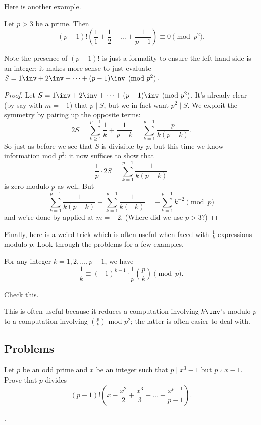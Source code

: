 \documentclass[11pt]{scrartcl}
\begin{document}
Here is another example.
\begin{example}
  Let $p > 3$ be a prime.
  Then
  \[ (p-1)!\left( \frac11 + \frac12 + \dots + \frac1{p-1} \right) \equiv 0 \pmod{p^2}. \]
\end{example}
Note the presence of $(p-1)!$ is just a formality to ensure
the left-hand side is an integer; it makes more sense
to just evaluate $S = 1\inv + 2\inv + \dots + (p-1)\inv \pmod{p^2}$.
\begin{proof}
  Let $S = 1\inv + 2\inv + \dots + (p-1)\inv \pmod{p^2}$.
  It's already clear (by say  with $m = -1$)
  that $p \mid S$, but we in fact want $p^2 \mid S$.
  We exploit the symmetry by pairing up the opposite terms:
  \[
    2S = \sum_{k \ge 1}^{p-1} \frac{1}{k} + \frac{1}{p-k}
    = \sum_{k=1}^{p-1} \frac{p}{k(p-k)}.
  \]
  So just as before we see that $S$ is divisible by $p$,
  but this time we know information mod $p^2$: it now suffices to show that
  \[ \frac{1}{p} \cdot 2S = \sum_{k=1}^{p-1} \frac{1}{k(p-k)} \]
  is zero modulo $p$ as well.
  But
  \[
    \sum_{k=1}^{p-1} \frac{1}{k(p-k)}
    \equiv \sum_{k=1}^{p-1} \frac{1}{k(-k)}
    = -\sum_{k=1}^{p-1} k^{-2}
    \pmod p
  \]
  and we're done by  applied at $m=-2$.
  (Where did we use $p > 3$?)
\end{proof}

Finally, here is a weird trick which is often useful when
faced with $\frac1k$ expressions modulo $p$.
Look through the problems for a few examples.
\begin{lemma}
  \label{lem:harmonic_p_trick}
  For any integer $k = 1, 2, \dots, p-1$, we have
  \[ \frac{1}{k} \equiv (-1)^{k-1} \cdot \frac1p \binom pk \pmod p. \]
\end{lemma}
\begin{exercise}
  Check this.
\end{exercise}

This is often useful because it reduces a computation
involving $k\inv$'s modulo $p$ to a computation
involving $\binom pk$ mod $p^2$;
the latter is often easier to deal with.

\subsection{Problems}
\begin{problem} %
  [ELMO 2009, John Berman]
  Let $p$ be an odd prime and $x$ be an integer
  such that $p \mid x^3 - 1$ but $p \nmid x - 1$.
  Prove that $p$ divides
  \[ (p-1)!
    \left( x - \frac{x^2}{2} + \frac{x^3}{3} - \dots - \frac{x^{p-1}}{p-1} \right).
  \]
  \begin{hint}
    .
  \end{hint}
\end{problem}
\end{document}
